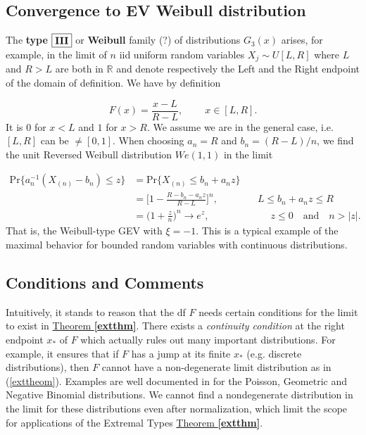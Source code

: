 \subsection*{Convergence to EV Weibull distribution}

The \textbf{type}  $\boxed{\textbf{\text{III}}}$ or \textbf{Weibull} family (?) of distributions $G_3(x)$ arises, for example, in the limit of $n$ iid uniform random variables $X_j\sim U[L,R]$ where $L$ and $R>L$ are both in $\mathbb{R}$  and denote respectively the Left and the Right endpoint of the domain of definition. We have by definition

\begin{equation*}
F(x)=\frac{x-L}{R-L}, \ \ \ \ \ \ \ \  \ \ x\in [L,R].
\end{equation*}
It is $0$ for $x<L$ and $1$ for $x>R$.
We assume we are in the general case, i.e. $[L,R]$ can be $\neq [0,1]$. When choosing $a_n=R$ and $b_n=(R-L)/n$, we find the unit Reversed Weibull distribution $We(1,1)$ in the limit 

\begin{equation*}
\begin{aligned}
\text{Pr}\{a_n^{-1}(X_{(n)}-b_n)\leq z\}
&=\text{Pr}\{X_{(n)}\leq b_n+a_nz\} \\
& = \bigg[1-\frac{R-b_n-a_nz}{R-L}\bigg]^n, \qquad\qquad L\leq b_n+a_nz\leq R \\ 
& = \Big(1+\frac{z}{n}\Big)^n\to e^z, \ \qquad \qquad\qquad  z\leq 0 \quad \text{and} \quad n>|z|.
\end{aligned}
\end{equation*}
 That is, the Weibull-type GEV with $\xi=-1$.
 This is a typical example of the maximal behavior for bounded random variables with
continuous distributions.


\subsection*{Conditions and Comments}

Intuitively, it stands to reason that the df $F$ needs certain conditions for the limit to exist in \hyperref[extthm]{Theorem \textbf{\ref{extthm}}}. There exists a \emph{continuity condition} at the right endpoint $x_*$ of $F$ which actually rules out many important distributions. For example, it ensures that if $F$ has a jump at its finite $x_*$ (e.g. discrete distributions), then $F$ cannot have a non-degenerate limit distribution as in (\ref{exttheom}). Examples are well documented in \citet[section 3.1]{embrechts_modelling_2011} for the Poisson, Geometric and Negative Binomial distributions. We cannot find a nondegenerate distribution in the limit for these distributions even after normalization, which limit the scope for applications of the Extremal Types \hyperref[extthm]{Theorem \textbf{\ref{extthm}}}. 

